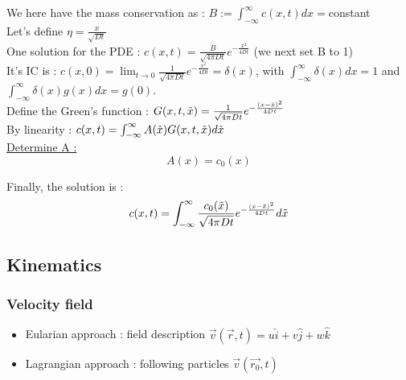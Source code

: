 \documentclass[../main.tex]{subfiles}
\begin{document}
We here have the mass conservation as : $B:= \int_{-\infty}^\infty c(x,t)dx = $constant\\
Let's define $\eta = \frac{x}{\sqrt{Dt}}$\\

One solution for the PDE : $c(x,t) = \frac{B}{\sqrt{4\pi Dt}} e^{-\frac{x^2}{4Dt}}$ (we next set B to 1)\\

It's IC is : $c(x,0) = \lim_{t\rightarrow 0} \frac{1}{\sqrt{4\pi Dt}} e^{-\frac{x^2}{4Dt}} = \delta(x)$, with $\int_{-\infty}^\infty \delta(x)dx = 1$ and $\int_{-\infty}^\infty \delta(x) g(x)dx = g(0)$.\\

Define the Green's function : $G(x,t,\Tilde{x} ) = \frac{1}{\sqrt{4\pi Dt}} e^{-\frac{(x-\Tilde{x})^2}{4Dt}}$\\

By linearity : $c(x,t) = \int_{-\infty}^\infty A(\Tilde{x}) G(x,t,\Tilde{x})d\Tilde{x}$\\

\quad \underline{Determine A :}\\
\begin{equation}
    A(x) = c_0(x)
\end{equation}

Finally, the solution is : \\
\begin{equation}
    c(x,t) = \int_{-\infty}^\infty \frac{c_0(\Tilde{x})}{\sqrt{4\pi Dt}} e^{-\frac{(x-\Tilde{x})^2}{4Dt}}d\Tilde{x}
\end{equation}

\subsection{Kinematics}
\subsubsection{Velocity field}
\begin{itemize}
    \item Eularian approach : field description $\Vec{v}(\Vec{r},t) = u \hat{i} + v \hat{j} + w\hat{k}$\\
    \item Lagrangian approach : following particles $\Vec{v}(\Vec{r_0},t)$\\
\end{itemize}
\end{document}
